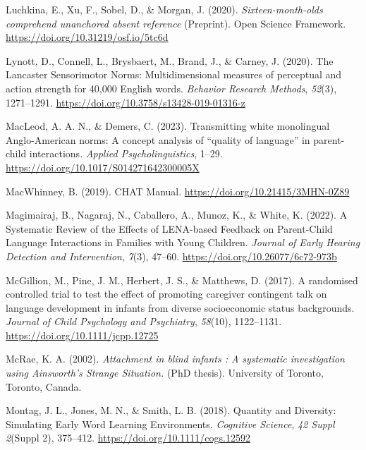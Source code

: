 \documentclass[
  man]{apa6}
\newlength{\cslhangindent}
\newlength{\cslentryspacingunit} %
\newenvironment{CSLReferences}[2] %
 {%
  \setlength{\parindent}{0pt}
  \ifodd #1
  \let\oldpar\par
  \def\par{\hangindent=\cslhangindent\oldpar}
  \fi
  \setlength{\parskip}{#2\cslentryspacingunit}
 }%
 {}
\begin{document}
\begin{CSLReferences}{1}{0}
\leavevmode{}%
Luchkina, E., Xu, F., Sobel, D., \& Morgan, J. (2020). \emph{Sixteen-month-olds comprehend unanchored absent reference} (Preprint). {Open Science Framework}. \url{https://doi.org/10.31219/osf.io/5tc6d}

\leavevmode{}%
Lynott, D., Connell, L., Brysbaert, M., Brand, J., \& Carney, J. (2020). The {Lancaster Sensorimotor Norms}: Multidimensional measures of perceptual and action strength for 40,000 {English} words. \emph{Behavior Research Methods}, \emph{52}(3), 1271--1291. \url{https://doi.org/10.3758/s13428-019-01316-z}

\leavevmode{}%
MacLeod, A. A. N., \& Demers, C. (2023). Transmitting white monolingual {Anglo-American} norms: {A} concept analysis of {``quality of language''} in parent-child interactions. \emph{Applied Psycholinguistics}, 1--29. \url{https://doi.org/10.1017/S014271642300005X}

\leavevmode{}%
MacWhinney, B. (2019). {CHAT Manual}. \url{https://doi.org/10.21415/3MHN-0Z89}

\leavevmode{}%
Magimairaj, B., Nagaraj, N., Caballero, A., Munoz, K., \& White, K. (2022). A {Systematic Review} of the {Effects} of {LENA-based Feedback} on {Parent-Child Language Interactions} in {Families} with {Young Children}. \emph{Journal of Early Hearing Detection and Intervention}, \emph{7}(3), 47--60. \url{https://doi.org/10.26077/6c72-973b}

\leavevmode{}%
McGillion, M., Pine, J. M., Herbert, J. S., \& Matthews, D. (2017). A randomised controlled trial to test the effect of promoting caregiver contingent talk on language development in infants from diverse socioeconomic status backgrounds. \emph{Journal of Child Psychology and Psychiatry}, \emph{58}(10), 1122--1131. \url{https://doi.org/10.1111/jcpp.12725}

\leavevmode{}%
McRae, K. A. (2002). \emph{Attachment in blind infants : A systematic investigation using {Ainsworth}'s {Strange Situation}.} (PhD thesis). University of Toronto, {Toronto, Canada}.

\leavevmode{}%
Montag, J. L., Jones, M. N., \& Smith, L. B. (2018). Quantity and {Diversity}: {Simulating Early Word Learning Environments}. \emph{Cognitive Science}, \emph{42 Suppl 2}(Suppl 2), 375--412. \url{https://doi.org/10.1111/cogs.12592}


\end{CSLReferences}
\end{document}
